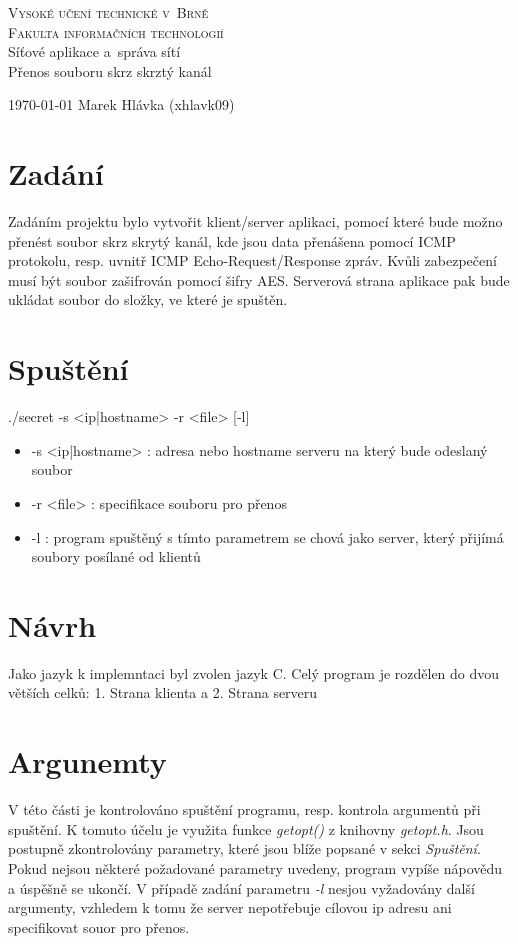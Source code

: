 \documentclass[a4paper, 11pt]{article}
\begin{document}
\begin{titlepage}
	\begin{center}
		\Huge
		\textsc{Vysoké učení technické v~Brně} \\
		\huge
		\textsc{Fakulta informačních technologií} \\
		\LARGE
		Síťové aplikace a~správa sítí\\
		\Huge
		Přenos souboru skrz skrztý kanál
	\end{center}
	{\Large
		\today
		\hfill
		Marek Hlávka (xhlavk09)
	}
\end{titlepage}
\tableofcontents
\newpage

\section{Zadání}
Zadáním projektu bylo vytvořit klient/server aplikaci, pomocí které bude možno přenést soubor skrz skrytý kanál, kde jsou data přenášena pomocí ICMP protokolu, resp. uvnitř ICMP Echo-Request/Response zpráv. Kvůli zabezpečení musí být soubor zašifrován pomocí šifry AES. Serverová strana aplikace pak bude ukládat soubor do složky, ve které je spuštěn.

\section{Spuštění}

\centerline{\large./secret -s <ip|hostname> -r <file> [-l]}
\begin{itemize}
\item -s <ip|hostname> : adresa nebo hostname serveru na který bude odeslaný soubor
\item -r <file> : specifikace souboru pro přenos
\item -l : program spuštěný s tímto parametrem se chová jako server, který přijímá soubory posílané od klientů
\end{itemize}

\section{Návrh}
Jako jazyk k implemntaci byl zvolen jazyk C. Celý program je rozdělen do dvou větších celků: 1. Strana klienta a 2. Strana serveru

\section{Argunemty}
V této části je kontrolováno spuštění programu, resp. kontrola argumentů při spuštění. K tomuto účelu je využita funkce \textit{getopt()} z knihovny \textit{getopt.h}. Jsou postupně zkontrolovány parametry, které jsou blíže popsané v sekci \textit{Spuštění}. Pokud nejsou některé požadované parametry uvedeny, program vypíše nápovědu a úspěšně se ukončí. V případě zadání parametru \textit{-l} nesjou vyžadovány další argumenty, vzhledem k tomu že server nepotřebuje cílovou ip adresu ani specifikovat souor pro přenos.
\end{document}
